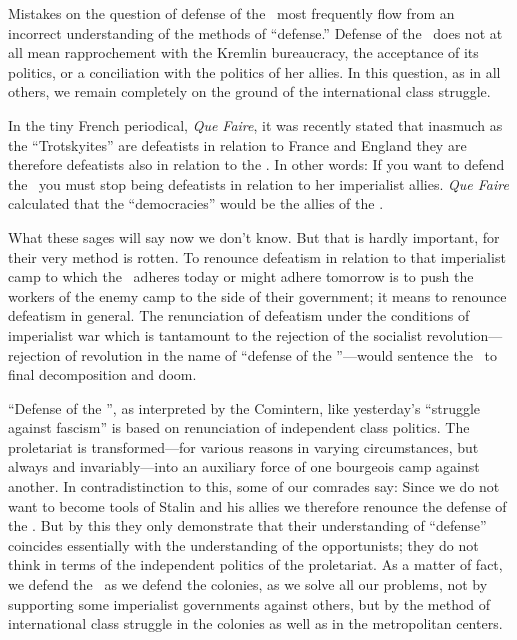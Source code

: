 Mistakes on the question of defense of the \USSR\ most frequently flow from an incorrect understanding of the methods of “defense.” Defense of the \USSR\ does not at all mean rapprochement with the Kremlin bureaucracy, the acceptance of its politics, or a conciliation with the politics of her allies. In this question, as in all others, we remain completely on the ground of the international class struggle.

In the tiny French periodical, \emph{Que Faire}, it was recently stated that inasmuch as the “Trotskyites” are defeatists in relation to France and England they are therefore defeatists also in relation to the \USSR. In other words: If you want to defend the \USSR\ you must stop being defeatists in relation to her imperialist allies. \emph{Que Faire} calculated that the “democracies” would be the allies of the \USSR.

What these sages will say now we don’t know. But that is hardly important, for their very method is rotten. To renounce defeatism in relation to that imperialist camp to which the \USSR\ adheres today or might adhere tomorrow is to push the workers of the enemy camp to the side of their government; it means to renounce defeatism in general. The renunciation of defeatism under the conditions of imperialist war which is tantamount to the rejection of the socialist revolution---rejection of revolution in the name of “defense of the \USSR”---would sentence the \USSR\ to final decomposition and doom.
\nowidow

“Defense of the \USSR”, as interpreted by the Comintern, like yesterday’s “struggle against fascism” is based on renunciation of independent class politics. The proletariat is transformed---for various reasons in varying circumstances, but always and invariably---into an auxiliary force of one bourgeois camp against another. In contradistinction to this, some of our comrades say: Since we do not want to become tools of Stalin and his allies we therefore renounce the defense of the \USSR. But by this they only demonstrate that their understanding of “defense” coincides essentially with the understanding of the opportunists; they do not think in terms of the independent politics of the proletariat. As a matter of fact, we defend the \USSR\ as we defend the colonies, as we solve all our problems, not by supporting some imperialist governments against others, but by the method of international class struggle in the colonies as well as in the metropolitan centers.


